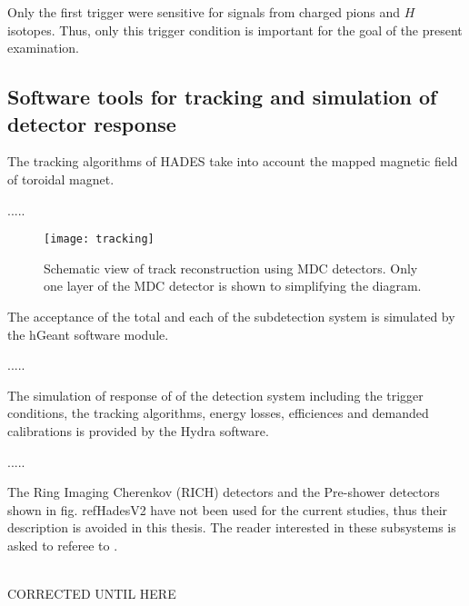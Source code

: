 Only the first trigger were sensitive for signals from charged pions and $H$ isotopes. 
Thus, only this trigger condition is important for the goal of the present examination.

\subsection{Software tools for tracking and simulation of detector response}

The tracking algorithms of HADES take into account the mapped magnetic field of toroidal magnet.

.....


\begin{figure}
	\centering
	\texttt{[image: tracking]}
	\caption{Schematic view of track reconstruction using MDC detectors. Only one layer of the MDC detector is shown to simplifying the diagram.  }
	\label{tracking}
\end{figure}


The acceptance of the total and each of the subdetection system is simulated 
by the hGeant software module.

.....

The simulation of response of of the detection system including the trigger conditions, the tracking algorithms, energy losses, efficiences 
and demanded calibrations is provided by the Hydra software.   


.....


 




















The Ring Imaging Cherenkov (RICH) detectors and the Pre-shower detectors shown in fig. ref{HadesV2} have not been used for the current studies, 
thus their description is avoided in this thesis. The reader interested in these subsystems is asked to referee to \cite{agakichiev2009HADES}.


 \ \\
 
 CORRECTED UNTIL HERE
 
 
 \ \\


